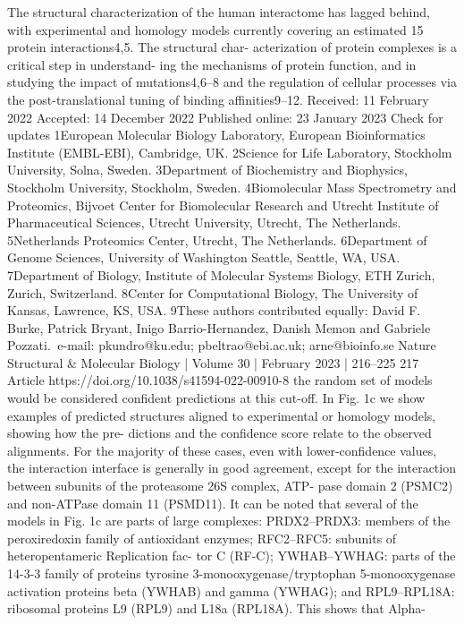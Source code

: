The structural characterization of the human interactome has
lagged behind, with experimental and homology models currently
covering an estimated 15 protein interactions4,5. The structural char-
acterization of protein complexes is a critical step in understand-
ing the mechanisms of protein function, and in studying the impact
of mutations4,6–8 and the regulation of cellular processes via the
post-translational tuning of binding affinities9–12.
Received: 11 February 2022
Accepted: 14 December 2022
Published online: 23 January 2023
 Check for updates
1European Molecular Biology Laboratory, European Bioinformatics Institute (EMBL-EBI), Cambridge, UK. 2Science for Life Laboratory, Stockholm
University, Solna, Sweden. 3Department of Biochemistry and Biophysics, Stockholm University, Stockholm, Sweden. 4Biomolecular Mass Spectrometry
and Proteomics, Bijvoet Center for Biomolecular Research and Utrecht Institute of Pharmaceutical Sciences, Utrecht University, Utrecht, The Netherlands.
5Netherlands Proteomics Center, Utrecht, The Netherlands. 6Department of Genome Sciences, University of Washington Seattle, Seattle, WA, USA.
7Department of Biology, Institute of Molecular Systems Biology, ETH Zurich, Zurich, Switzerland. 8Center for Computational Biology, The University of
Kansas, Lawrence, KS, USA. 9These authors contributed equally: David F. Burke, Patrick Bryant, Inigo Barrio-Hernandez, Danish Memon and Gabriele
Pozzati.
 e-mail: pkundro@ku.edu; pbeltrao@ebi.ac.uk; arne@bioinfo.se
Nature Structural \& Molecular Biology | Volume 30 | February 2023 | 216–225
217
Article
https://doi.org/10.1038/s41594-022-00910-8
the random set of models would be considered confident predictions
at this cut-off. In Fig. 1c we show examples of predicted structures
aligned to experimental or homology models, showing how the pre-
dictions and the confidence score relate to the observed alignments.
For the majority of these cases, even with lower-confidence values, the
interaction interface is generally in good agreement, except for the
interaction between subunits of the proteasome 26S complex, ATP-
pase domain 2 (PSMC2) and non-ATPase domain 11 (PSMD11). It can be
noted that several of the models in Fig. 1c are parts of large complexes:
PRDX2–PRDX3: members of the peroxiredoxin family of antioxidant
enzymes; RFC2–RFC5: subunits of heteropentameric Replication fac-
tor C (RF-C); YWHAB–YWHAG: parts of the 14-3-3 family of proteins
tyrosine 3-monooxygenase/tryptophan 5-monooxygenase activation
proteins beta (YWHAB) and gamma (YWHAG); and RPL9–RPL18A:
ribosomal proteins L9 (RPL9) and L18a (RPL18A). This shows that Alpha-
